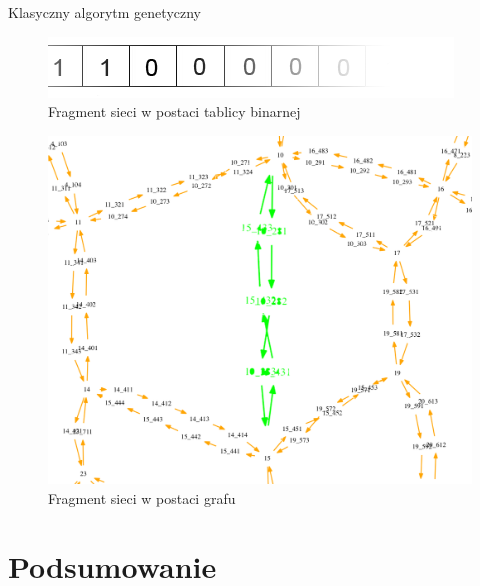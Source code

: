 \documentclass{beamer}
\begin{document}
\begin{frame}{Klasyczny algorytm genetyczny} 

\centering
\begin{minipage}[b]{.48\textwidth}
\begin{figure}[]
\includegraphics[width=\textwidth]{img/bool}
\caption{Fragment sieci w postaci tablicy binarnej }
\end{figure}
\end{minipage}\hfill
\begin{minipage}[b]{.48\textwidth}
\begin{figure}[]
\includegraphics[width=\textwidth]{img/bool-efect}
\caption{Fragment sieci w postaci grafu}
\end{figure}
\end{minipage}\hfill
\end{frame}


\section{Podsumowanie}
\end{document}
